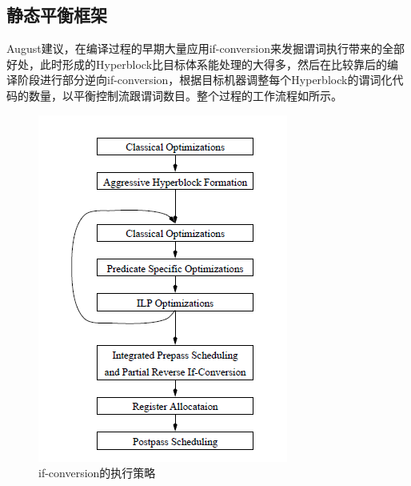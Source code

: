 \subsection{静态平衡框架}

August建议，在编译过程的早期大量应用if-conversion来发掘谓词执行带来的全部好处，此时形成的Hyperblock比目标体系能处理的大得多，然后在比较靠后的编译阶段进行部分逆向if-conversion，根据目标机器调整每个Hyperblock的谓词化代码的数量，以平衡控制流跟谓词数目。整个过程的工作流程如所示。

\begin{figure}
\includegraphics[width=\linewidth]{policy/ifcvt-framework}
\caption{\label{fig:ifcvtframework} if-conversion的执行策略}
\end{figure}